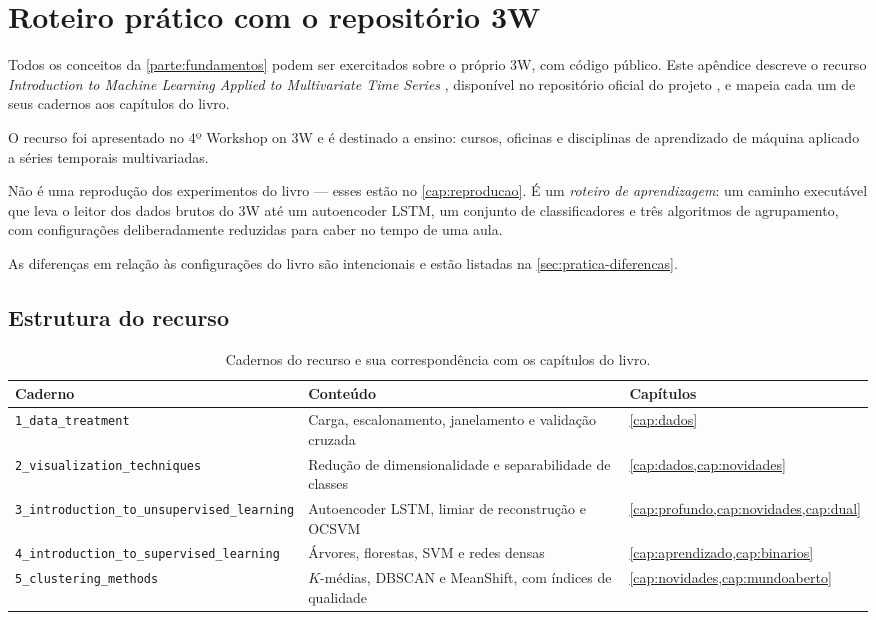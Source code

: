\chapter{Roteiro prático com o repositório 3W}
\label{cap:pratica}

Todos os conceitos da \cref{parte:fundamentos} podem ser exercitados sobre o próprio 3W,
com código público. Este apêndice descreve o recurso
\emph{Introduction to Machine Learning Applied to Multivariate Time Series}
\citep{Lopes2026Intro3W}, disponível no repositório oficial do projeto
\citep{Petrobras3W}, e mapeia cada um de seus cadernos aos capítulos do livro.

O recurso foi apresentado no 4º Workshop on 3W e é destinado a ensino: cursos,
oficinas e disciplinas de aprendizado de máquina aplicado a séries temporais
multivariadas.

\begin{destaque}
Não é uma reprodução dos experimentos do livro --- esses estão no
\cref{cap:reproducao}. É um \emph{roteiro de aprendizagem}: um caminho executável que
leva o leitor dos dados brutos do 3W até um autoencoder LSTM, um conjunto de
classificadores e três algoritmos de agrupamento, com configurações deliberadamente
reduzidas para caber no tempo de uma aula.

As diferenças em relação às configurações do livro são intencionais e estão listadas na
\cref{sec:pratica-diferencas}.
\end{destaque}

\section{Estrutura do recurso}

\begin{table}[htbp]
\centering
\caption{Cadernos do recurso e sua correspondência com os capítulos do livro.}
\label{tab:pratica-mapa}
\small
\begin{tabular}{p{4.4cm}p{4.2cm}p{4.0cm}}
\toprule
\textbf{Caderno} & \textbf{Conteúdo} & \textbf{Capítulos} \\
\midrule
\texttt{1\_data\_treatment} &
Carga, escalonamento, janelamento e validação cruzada &
\cref{cap:dados} \\
\addlinespace
\texttt{2\_visualization\_techniques} &
Redução de dimensionalidade e separabilidade de classes &
\cref{cap:dados,cap:novidades} \\
\addlinespace
\texttt{3\_introduction\_to\_unsu\-pervised\_learning} &
Autoencoder LSTM, limiar de reconstrução e OCSVM &
\cref{cap:profundo,cap:novidades,cap:dual} \\
\addlinespace
\texttt{4\_introduction\_to\_super\-vised\_learning} &
Árvores, florestas, SVM e redes densas &
\cref{cap:aprendizado,cap:binarios} \\
\addlinespace
\texttt{5\_clustering\_methods} &
$K$-médias, DBSCAN e MeanShift, com índices de qualidade &
\cref{cap:novidades,cap:mundoaberto} \\
\bottomrule
\end{tabular}
\end{table}

